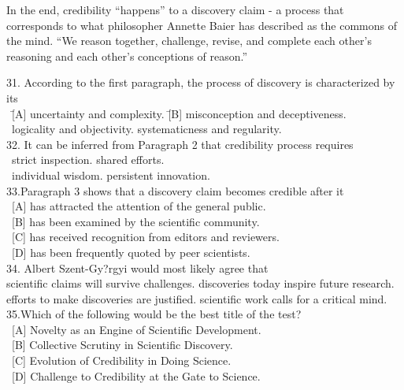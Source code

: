 In the end, credibility “happens” to a discovery claim - a process that corresponds to what philosopher Annette Baier has described as the commons of the mind. “We reason together, challenge, revise, and complete each other’s reasoning and each other’s conceptions of reason.”

\begin{tabbing}
31. According to the first paragraph, the process of discovery is characterized by its\\
\ \= [A] uncertainty and complexity. \quad\quad\quad\quad\quad\= [B] misconception and deceptiveness.\\
\ \> [C] logicality and objectivity. \> [D] systematicness and regularity.\\
32. It can be inferred from Paragraph 2 that credibility process requires\\
\ \> [A] strict inspection. \> [B] shared efforts.\\
\ \> [C] individual wisdom. \> [D] persistent innovation.\\
33.Paragraph 3 shows that a discovery claim becomes credible after it\\
\ [A] has attracted the attention of the general public.\\
\ [B] has been examined by the scientific community.\\
\ [C] has received recognition from editors and reviewers.\\
\ [D] has been frequently quoted by peer scientists.\\
34. Albert Szent-Gy?rgyi would most likely agree that\\
\> [A] scientific claims will survive challenges. \> [B] discoveries today inspire future research.\\
\> [C] efforts to make discoveries are justified. \> [D] scientific work calls for a critical mind.\\
35.Which of the following would be the best title of the test?\\
\ [A] Novelty as an Engine of Scientific Development.\\
\ [B] Collective Scrutiny in Scientific Discovery.\\
\ [C] Evolution of Credibility in Doing Science.\\
\ [D] Challenge to Credibility at the Gate to Science.\\
\end{tabbing}

